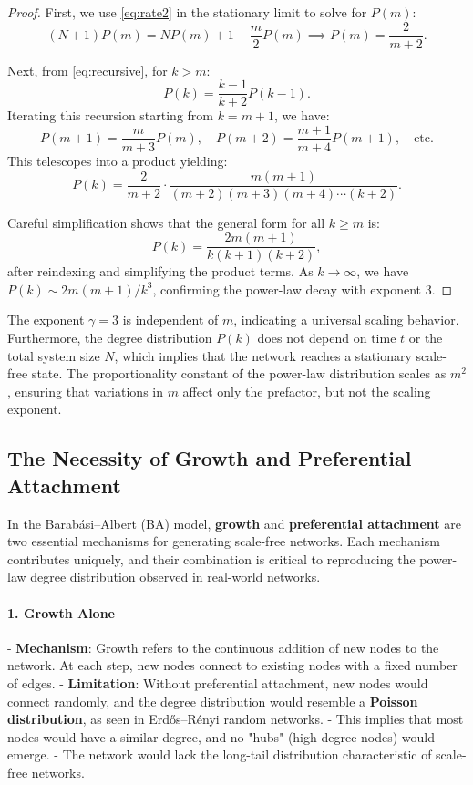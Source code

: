 \documentclass{article}
\begin{document}
\begin{proof}
First, we use \eqref{eq:rate2} in the stationary limit to solve for $P(m)$:
\[
(N+1)P(m) = NP(m) + 1 - \frac{m}{2}P(m) \implies P(m)=\frac{2}{m+2}.
\]

Next, from \eqref{eq:recursive}, for $k>m$:
\[
P(k) = \frac{k-1}{k+2}P(k-1).
\]
Iterating this recursion starting from $k=m+1$, we have:
\[
P(m+1) = \frac{m}{m+3} P(m), \quad P(m+2)=\frac{m+1}{m+4}P(m+1), \quad \text{etc.}
\]
This telescopes into a product yielding:
\[
P(k) = \frac{2}{m+2} \cdot \frac{m(m+1)}{(m+2)(m+3)(m+4)\cdots(k+2)}.
\]

Careful simplification shows that the general form for all $k\geq m$ is:
\[
P(k)=\frac{2m(m+1)}{k(k+1)(k+2)},
\]
after reindexing and simplifying the product terms. As $k \to \infty$, we have $P(k)\sim 2m(m+1)/k^3$, confirming the power-law decay with exponent $3$.
\end{proof}

\begin{remark}
The exponent $\gamma = 3$ is independent of $m$, indicating a universal scaling behavior. Furthermore, the degree distribution $P(k)$ does not depend on time $t$ or the total system size $N$, which implies that the network reaches a stationary scale-free state. The proportionality constant of the power-law distribution scales as $m^2$, ensuring that variations in $m$ affect only the prefactor, but not the scaling exponent.
\end{remark}

\subsection{The Necessity of Growth and Preferential Attachment}

In the Barabási–Albert (BA) model, \textbf{growth} and \textbf{preferential attachment} are two essential mechanisms for generating scale-free networks. Each mechanism contributes uniquely, and their combination is critical to reproducing the power-law degree distribution observed in real-world networks.

\paragraph{1. Growth Alone}
- \textbf{Mechanism}: Growth refers to the continuous addition of new nodes to the network. At each step, new nodes connect to existing nodes with a fixed number of edges.
- \textbf{Limitation}: Without preferential attachment, new nodes would connect randomly, and the degree distribution would resemble a \textbf{Poisson distribution}, as seen in Erdős–Rényi random networks.
  - This implies that most nodes would have a similar degree, and no "hubs" (high-degree nodes) would emerge.
  - The network would lack the long-tail distribution characteristic of scale-free networks.
\end{document}
